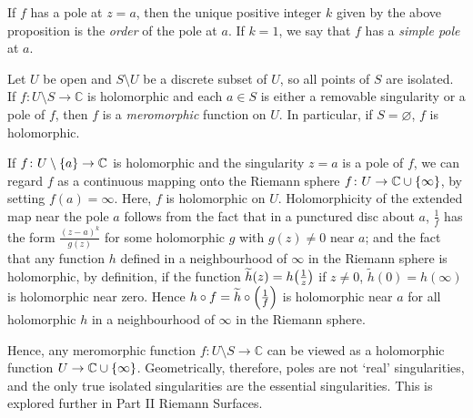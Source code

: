 \begin{definition}
	If \( f \) has a pole at \( z = a \), then the unique positive integer \( k \) given by the above proposition is the \textit{order} of the pole at \( a \).
	If \( k = 1 \), we say that \( f \) has a \textit{simple pole} at \( a \).

	Let \( U \) be open and \( S \setminus U \) be a discrete subset of \( U \), so all points of \( S \) are isolated.
	If \( f \colon U \setminus S \to \mathbb C \) is holomorphic and each \( a \in S \) is either a removable singularity or a pole of \( f \), then \( f \) is a \textit{meromorphic} function on \( U \).
	In particular, if \( S = \varnothing \), \( f \) is holomorphic.
\end{definition}
\begin{remark}
	If \( f \colon U \setminus \qty{a} \to \mathbb C \) is holomorphic and the singularity \( z = a \) is a pole of \( f \), we can regard \( f \) as a continuous mapping onto the Riemann sphere \( f \colon U \to \mathbb C \cup \qty{\infty} \), by setting \( f(a) = \infty \).
	Here, \( f \) is holomorphic on \( U \).
	Holomorphicity of the extended map near the pole \( a \) follows from the fact that in a punctured disc about \( a \), \( \frac{1}{f} \) has the form \( \frac{(z-a)^k}{g(z)} \) for some holomorphic \( g \) with \( g(z) \neq 0 \) near \( a \); and the fact that any function \( h \) defined in a neighbourhood of \( \infty \) in the Riemann sphere is holomorphic, by definition, if the function \( \widetilde h(z) = h\qty(\frac{1}{z}) \) if \( z \neq 0 \), \( \widetilde h(0) = h(\infty) \) is holomorphic near zero.
	Hence \( h \circ f = \widetilde h \circ \qty(\frac{1}{f}) \) is holomorphic near \( a \) for all holomorphic \( h \) in a neighbourhood of \( \infty \) in the Riemann sphere.

	Hence, any meromorphic function \( f \colon U \setminus S \to \mathbb C \) can be viewed as a holomorphic function \( U \to \mathbb C \cup \qty{\infty} \).
	Geometrically, therefore, poles are not `real' singularities, and the only true isolated singularities are the essential singularities.
	This is explored further in Part II Riemann Surfaces.
\end{remark}

